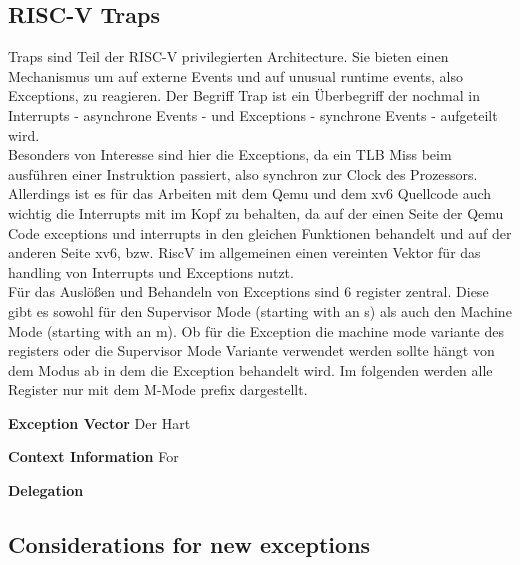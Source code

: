 \subsection{RISC-V Traps}
Traps sind Teil der RISC-V privilegierten Architecture. Sie bieten einen Mechanismus
um auf externe Events und auf unusual runtime events, also Exceptions, zu reagieren\cite{riscvreader}.
Der Begriff Trap ist ein Überbegriff der nochmal in Interrupts - asynchrone Events - und
Exceptions - synchrone Events - aufgeteilt wird.\\
Besonders von Interesse sind hier die Exceptions, da ein TLB Miss beim ausführen einer Instruktion
passiert, also synchron zur Clock des Prozessors. Allerdings ist es für das Arbeiten mit
dem Qemu und dem xv6 Quellcode auch wichtig die Interrupts mit im Kopf zu behalten, da auf der
einen Seite der Qemu Code exceptions und interrupts in den gleichen Funktionen behandelt und
auf der anderen Seite xv6, bzw. RiscV im allgemeinen einen vereinten Vektor für das handling
von Interrupts und Exceptions nutzt\cite{RISCVInstructionSet}. \\

Für das Auslößen und Behandeln von Exceptions sind 6 register zentral. Diese gibt es sowohl
für den Supervisor Mode (starting with an s) als auch den Machine Mode (starting with an m).
 Ob für die Exception die machine mode variante des
registers oder die Supervisor Mode Variante verwendet werden sollte hängt von dem Modus ab
in dem die Exception behandelt wird. Im folgenden werden alle Register nur mit dem M-Mode 
prefix dargestellt. 


\textbf{Exception Vector} Der Hart 

\textbf{Context Information} For

\textbf{Delegation}



\subsection{Considerations for new exceptions}

